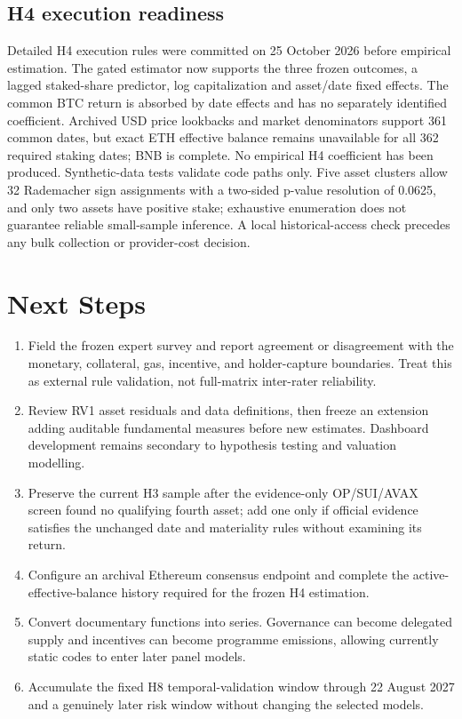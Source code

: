\documentclass[10pt]{article}
\begin{document}
\subsection{H4 execution readiness}
Detailed H4 execution rules were committed on 25 October 2026 before empirical estimation. The gated estimator now supports the three frozen outcomes, a lagged staked-share predictor, log capitalization and asset/date fixed effects. The common BTC return is absorbed by date effects and has no separately identified coefficient. Archived USD price lookbacks and market denominators support 361 common dates, but exact ETH effective balance remains unavailable for all 362 required staking dates; BNB is complete. No empirical H4 coefficient has been produced. Synthetic-data tests validate code paths only. Five asset clusters allow 32 Rademacher sign assignments with a two-sided p-value resolution of 0.0625, and only two assets have positive stake; exhaustive enumeration does not guarantee reliable small-sample inference. A local historical-access check precedes any bulk collection or provider-cost decision.

\section{Next Steps}
\begin{enumerate}
\item Field the frozen expert survey and report agreement or disagreement with the monetary, collateral, gas, incentive, and holder-capture boundaries. Treat this as external rule validation, not full-matrix inter-rater reliability.
\item Review RV1 asset residuals and data definitions, then freeze an extension adding auditable fundamental measures before new estimates. Dashboard development remains secondary to hypothesis testing and valuation modelling.
\item Preserve the current H3 sample after the evidence-only OP/SUI/AVAX screen found no qualifying fourth asset; add one only if official evidence satisfies the unchanged date and materiality rules without examining its return.
\item Configure an archival Ethereum consensus endpoint and complete the active-effective-balance history required for the frozen H4 estimation.
\item Convert documentary functions into series. Governance can become delegated supply and incentives can become programme emissions, allowing currently static codes to enter later panel models.
\item Accumulate the fixed H8 temporal-validation window through 22 August 2027 and a genuinely later risk window without changing the selected models.
\end{enumerate}
\end{document}
